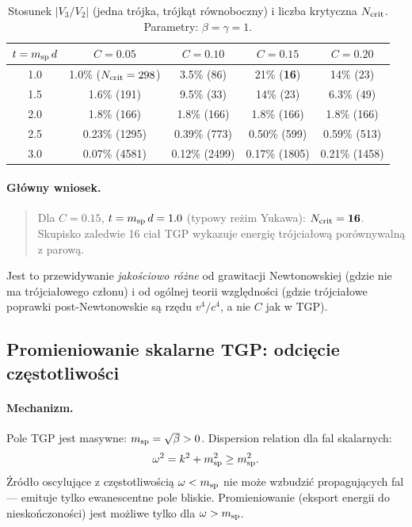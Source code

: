 \begin{table}[h]
\centering
\caption{Stosunek $|V_3/V_2|$ (jedna trójka, trójkąt równoboczny)
         i liczba krytyczna $N_{\rm crit}$.
         Parametry: $\beta = \gamma = 1$.}
\label{tab:Ncrit}
\begin{tabular}{ccccc}
\toprule
$t = m_{\rm sp}\,d$ & $C=0.05$ & $C=0.10$ & $C=0.15$ & $C=0.20$ \\
\midrule
1.0 & 1.0\% ($N_{\rm crit}=298$) & 3.5\% (86) & 21\% (\textbf{16}) & 14\% (23) \\
1.5 & 1.6\% (191) & 9.5\% (33) & 14\% (23) & 6.3\% (49) \\
2.0 & 1.8\% (166) & 1.8\% (166) & 1.8\% (166) & 1.8\% (166) \\
2.5 & 0.23\% (1295) & 0.39\% (773) & 0.50\% (599) & 0.59\% (513) \\
3.0 & 0.07\% (4581) & 0.12\% (2499) & 0.17\% (1805) & 0.21\% (1458) \\
\bottomrule
\end{tabular}
\end{table}

\paragraph{Główny wniosek.}
\begin{quote}
Dla $C = 0.15$, $t = m_{\rm sp}\,d = 1.0$ (typowy reżim Yukawa):
$N_{\rm crit} = \mathbf{16}$.
Skupisko zaledwie 16 ciał TGP wykazuje energię trójciałową
porównywalną z parową.
\end{quote}

Jest to przewidywanie \emph{jakościowo różne} od grawitacji Newtonowskiej
(gdzie nie ma trójciałowego członu) i od ogólnej teorii względności
(gdzie trójciałowe poprawki post-Newtonowskie są rzędu $v^4/c^4$,
a nie $C$ jak w TGP).

\subsection{Promieniowanie skalarne TGP: odcięcie częstotliwości}

\paragraph{Mechanizm.}
Pole TGP jest masywne: $m_{\rm sp} = \sqrt{\beta} > 0$.
Dispersion relation dla fal skalarnych:
\begin{equation}
\omega^2 = k^2 + m_{\rm sp}^2 \geq m_{\rm sp}^2.
\end{equation}
Źródło oscylujące z częstotliwością $\omega < m_{\rm sp}$ nie może
wzbudzić propagujących fal — emituje tylko ewanescentne pole bliskie.
Promieniowanie (eksport energii do nieskończoności) jest możliwe
tylko dla $\omega > m_{\rm sp}$.


